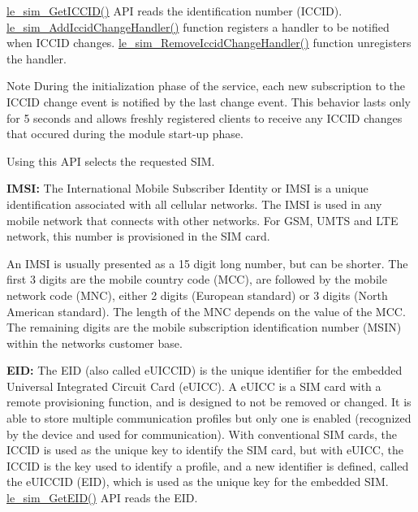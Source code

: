 \hyperlink{le__sim__interface_8h_a7b43e4e8713af665657e15ae0f5bc1e8}{le\+\_\+sim\+\_\+\+Get\+I\+C\+C\+I\+D()} A\+PI reads the identification number (I\+C\+C\+ID). \hyperlink{le__sim__interface_8h_afc1b8e2aa1b36ed116e9fae4a9a66057}{le\+\_\+sim\+\_\+\+Add\+Iccid\+Change\+Handler()} function registers a handler to be notified when I\+C\+C\+ID changes. \hyperlink{le__sim__interface_8h_ad357ed6124852a92bb30d59227fc5ec2}{le\+\_\+sim\+\_\+\+Remove\+Iccid\+Change\+Handler()} function unregisters the handler.

\begin{DoxyNote}{Note}
During the initialization phase of the service, each new subscription to the I\+C\+C\+ID change event is notified by the last change event. This behavior lasts only for 5 seconds and allows freshly registered clients to receive any I\+C\+C\+ID changes that occured during the module start-\/up phase.
\end{DoxyNote}
Using this A\+PI selects the requested S\+IM.

{\bfseries I\+M\+SI\+:} The International Mobile Subscriber Identity or I\+M\+SI is a unique identification associated with all cellular networks. The I\+M\+SI is used in any mobile network that connects with other networks. For G\+SM, U\+M\+TS and L\+TE network, this number is provisioned in the S\+IM card.

An I\+M\+SI is usually presented as a 15 digit long number, but can be shorter. The first 3 digits are the mobile country code (M\+CC), are followed by the mobile network code (M\+NC), either 2 digits (European standard) or 3 digits (North American standard). The length of the M\+NC depends on the value of the M\+CC. The remaining digits are the mobile subscription identification number (M\+S\+IN) within the network\textquotesingle{}s customer base.

{\bfseries E\+ID\+:} The E\+ID (also called e\+U\+I\+C\+C\+ID) is the unique identifier for the embedded Universal Integrated Circuit Card (e\+U\+I\+CC). A e\+U\+I\+CC is a S\+IM card with a remote provisioning function, and is designed to not be removed or changed. It is able to store multiple communication profiles but only one is enabled (recognized by the device and used for communication). With conventional S\+IM cards, the I\+C\+C\+ID is used as the unique key to identify the S\+IM card, but with e\+U\+I\+CC, the I\+C\+C\+ID is the key used to identify a profile, and a new identifier is defined, called the e\+U\+I\+C\+C\+ID (E\+ID), which is used as the unique key for the embedded S\+IM. \hyperlink{le__sim__interface_8h_a069ff8cf1d16a1b639c893619a618c10}{le\+\_\+sim\+\_\+\+Get\+E\+I\+D()} A\+PI reads the E\+ID.

